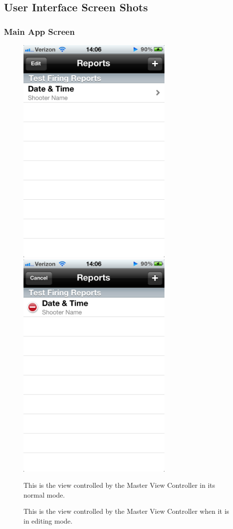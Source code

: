 \newpage
\subsection{User Interface Screen Shots}
\subsubsection{Main App Screen}
\begin{figure}[H!htb]
\includegraphics[width=3in]{ScreenShots111011/MainPage.png}
\includegraphics[width=3in]{ScreenShots111011/MainPageEdit.png}
\begin{minipage}{0.5\linewidth}
\caption{This is the view controlled by the Master View Controller in its normal mode.}
\end{minipage}
\begin{minipage}{0.5\linewidth}
\caption{This is the view controlled by the Master View Controller when it is in editing mode.}
\end{minipage}
\end{figure}

